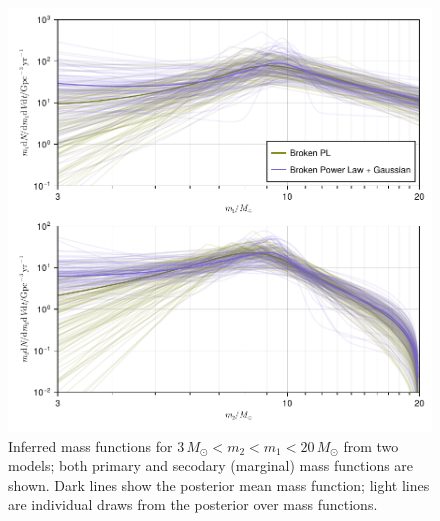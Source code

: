 \documentclass[modern]{aastex631}
\begin{document}
\begin{figure}
    \includegraphics[width=\columnwidth]{figures/dNdm_traces_including_230529.pdf}
    \caption{\label{fig:dNdm-traces_including_230529} Inferred mass functions for $3 \, M_\odot <
    m_2 < m_1 < 20 \, M_\odot$ from two models; both primary and secodary
    (marginal) mass functions are shown.  Dark lines show the posterior mean
    mass function; light lines are individual draws from the posterior over mass
    functions.}
\end{figure}
\end{document}
